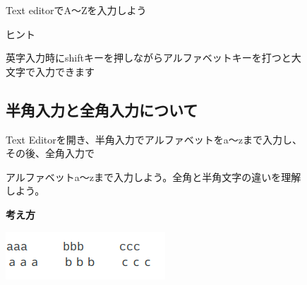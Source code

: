 \documentclass[a4paper,12pt]{jarticle}
\begin{document}
\begin{figure}[ht]
  \flushleft
  \theQuestion\label{Q:hasAnswer02-4}
  Text editorでA〜Zを入力しよう

  ヒント

  英字入力時にshiftキーを押しながらアルファベットキーを打つと大文字で入力できます
\end{figure}
\clearpage
\begin{figure}[ht]
  \subsection{\theExercise 半角入力と全角入力について}
  Text
  Editorを開き、半角入力でアルファベットをa〜zまで入力し、その後、全角入力で

  アルファベットa〜zまで入力しよう。全角と半角文字の違いを理解しよう。

  {\bf\large 考え方}

  \centering
  \includegraphics[width=5.978cm,height=1.773cm]{textbook-img066.png}

  \begin{minipage}{16.578cm}

    \bigskip


\end{minipage}
\end{figure}
\end{document}
